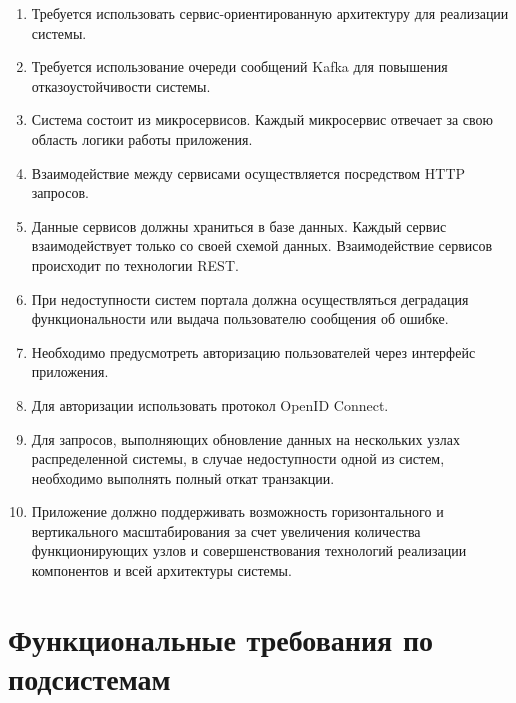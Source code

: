 \begin{enumerate}
	\item Требуется использовать сервис-ориентированную архитектуру для реализации системы.
    \item Требуется использование очереди сообщений Kafka для повышения отказоустойчивости системы.
	\item Система состоит из микросервисов. Каждый микросервис отвечает за свою область логики работы приложения.
	\item Взаимодействие между сервисами осуществляется посредством HTTP запросов.
	\item Данные сервисов должны храниться в базе данных. Каждый сервис взаимодействует только со своей схемой данных. Взаимодействие сервисов происходит по технологии REST.
	\item При недоступности систем портала должна осуществляться деградация функциональности или выдача пользователю сообщения об ошибке.
	\item Необходимо предусмотреть авторизацию пользователей через интерфейс приложения.
	\item Для авторизации использовать протокол OpenID Connect.
	\item Для запросов, выполняющих обновление данных на нескольких узлах распределенной системы, в случае недоступности одной из систем, необходимо выполнять полный откат транзакции.
	\item Приложение должно поддерживать возможность горизонтального и вертикального масштабирования за счет увеличения количества функционирующих узлов и совершенствования технологий реализации компонентов и всей архитектуры системы.
\end{enumerate}


\section*{Функциональные требования по подсистемам}

